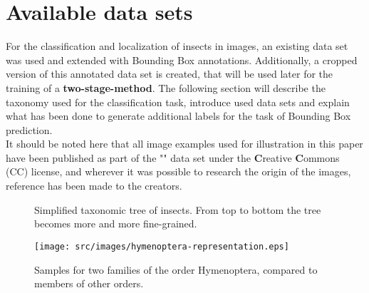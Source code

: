 \section{Available data sets}\label{sec:available-data-sets}
For the classification and localization of insects in images, an existing data set was used and extended with Bounding Box annotations.
Additionally, a cropped version of this annotated data set is created, that will be used later for the training of a \textbf{two-stage-method}.
The following section will describe the taxonomy used for the classification task, introduce used data sets
and explain what has been done to generate additional labels for the task of Bounding Box prediction.\\
It should be noted here that all image examples used for illustration in this paper have been published as part of the "" data set under the \textbf{C}reative \textbf{C}ommons (CC) license, and wherever it was possible to research the origin of the images, reference has been made to the creators.

\begin{figure}[!ht]
\centering
\begin{minipage}{.45\textwidth}
\vspace{1.2cm}
\centering
    \caption{Simplified taxonomic tree of insects.
From top to bottom the tree becomes more and more fine-grained.}
    \label{fig:taxonomy}

\end{minipage}
\hfill
\begin{minipage}{.45\textwidth}

    \texttt{[image: src/images/hymenoptera-representation.eps]}
    \caption{
    Samples for two families of the order Hymenoptera, compared to members of other orders.
    }
    \label{fig:hymenoptera-families}
\end{minipage}
\end{figure}
